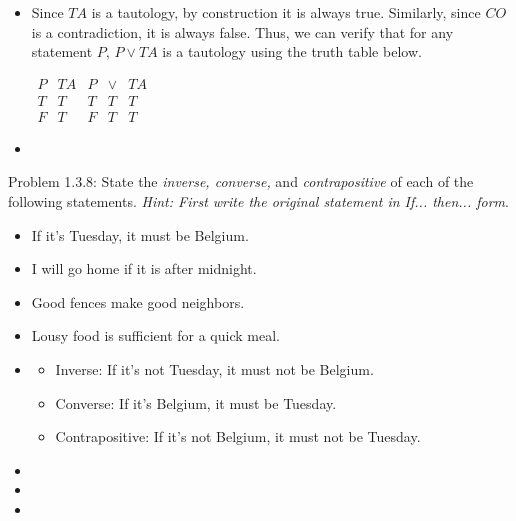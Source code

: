 \documentclass{article}
\theoremstyle{definition}
\begin{document}
	\vspace{0.25cm}
	\begin{itemize}
		\item[(1)] Since $TA$ is a tautology, by construction it is always
		true. Similarly, since $CO$ is a contradiction, it is always false.
		Thus, we can verify that for any statement $P$, $P\vee TA$ is a
		tautology using the truth table
		below.

		\vspace{0.25cm}

		$\begin{array}{c|c|ccc}
			 P&TA&P&\vee&TA\\\hline
			 T & T & T & T & T\\
			 F & T & F & T & T
		\end{array}$

		\vspace{0.25cm}

		\item[(2)]
	\end{itemize}

	\vspace{.5cm}


	\noindent Problem 1.3.8: State the {\it inverse, converse,} and {\it contrapositive} of each of the following statements. \emph{Hint: First write the original statement in If... then... form}.
	\begin{itemize}
		\item[(1)] If it's Tuesday, it must be Belgium.
		\item[(2)] I will go home if it is after midnight.
		\item[(3)] Good fences make good neighbors.
		\item[(4)] Lousy food is sufficient for a quick meal.
	\end{itemize}

	\vspace{0.25cm}
	\begin{itemize}
		\item[(1)]
		\begin{itemize}
			\item Inverse: If it's not Tuesday, it must not be Belgium.
			\item Converse: If it's Belgium, it must be Tuesday.
			\item Contrapositive: If it's not Belgium, it must not be Tuesday.
		\end{itemize}
		\item[(2)]
		\item[(3)]
		\item[(4)]
	\end{itemize}
\end{document}
